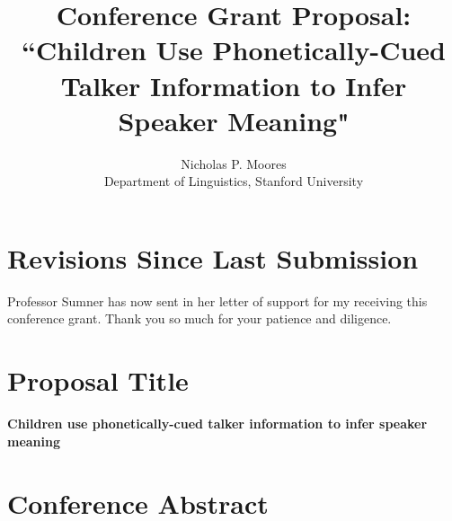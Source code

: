 \documentclass[12pt, oneside]{article}   	%
\title{Conference Grant Proposal: ``Children Use Phonetically-Cued Talker Information to Infer Speaker Meaning"}
\author{Nicholas P. Moores \\ Department of Linguistics, Stanford University}
\date{}							%
\begin{document}
\maketitle
\section{Revisions Since Last Submission} Professor Sumner has now sent in her letter of support for my receiving this conference grant. Thank you so much for your patience and diligence.
\section{Proposal Title} {\bf Children use phonetically-cued talker information to infer speaker meaning}
\section{Conference Abstract} 
\end{document}

